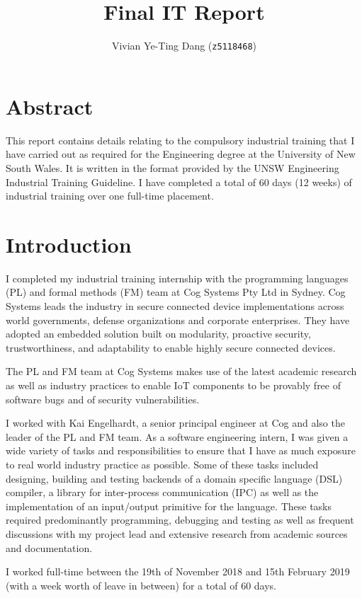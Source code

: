 \documentclass{report}
\title{Final IT Report}
\author{Vivian Ye-Ting Dang (\texttt{z5118468})}
\begin{document}
\maketitle
\tableofcontents

\chapter*{Abstract}
This report contains details relating to the compulsory industrial training 
that I have carried out as required for the Engineering degree at the University of New South Wales.
It is written in the format provided by the UNSW Engineering Industrial Training Guideline.
I have completed a total of 60 days (12 weeks) of industrial training over one full-time placement.

\chapter{Introduction}
I completed my industrial training internship with the programming languages (PL) and formal methods 
(FM) team at Cog Systems Pty Ltd in Sydney. 
Cog Systems leads the industry in secure connected device implementations across world governments, 
defense organizations and corporate enterprises.
They have adopted an embedded solution built on modularity, proactive security, trustworthiness, 
and adaptability to enable highly secure connected devices.

The PL and FM team at Cog Systems makes use of the latest academic research as well as 
industry practices to enable IoT components to be provably free of software bugs and of security 
vulnerabilities.

I worked with Kai Engelhardt, a senior principal engineer at Cog and also the leader of the PL and 
FM team. 
As a software engineering intern, I was given a wide variety of tasks and responsibilities to 
ensure that I have as much exposure to real world industry practice as possible.
Some of these tasks included designing, building and testing backends of a domain specific 
language (DSL) compiler, a library for inter-process communication (IPC) 
as well as the implementation of an input/output primitive for the language.
These tasks required predominantly programming, debugging and testing as well as frequent 
discussions with my project lead and extensive research from academic sources and documentation.

I worked full-time between the 19th of November 2018 and 15th February 2019 (with a week worth of 
leave in between) for a total of 60 days.
\end{document}
